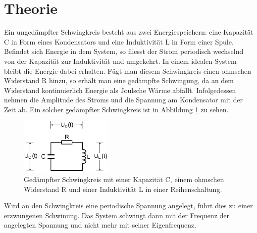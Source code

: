 \section{Theorie}
\label{sec:Theorie}
Ein ungedämpfter Schwingkreis besteht aus zwei Energiespeichern: eine Kapazität C
in Form eines Kondensators und eine Induktivität L in Form einer Spule. Befindet
sich Energie in dem System, so fliesst der Strom periodisch wechselnd von der
Kapazität zur Induktivität und umgekehrt. In einem idealen System bleibt die Energie
dabei erhalten.
Fügt man diesem Schwingkreis einen ohmschen Widerstand R hinzu, so erhält man eine
gedämpfte Schwingung, da an dem Widerstand kontinuierlich Energie als Joulsche Wärme
abfällt. Infolgedessen nehmen die Amplitude des Stroms und die Spannung am
Kondensator mit der Zeit ab. Ein solcher gedämpfter Schwingkreis ist in Abbildung
\ref{fig:gedaempfter_schwingkreis} zu sehen.
\begin{figure}
  \centering
  \includegraphics[width=0.4\textwidth]{gedaempfter_schwingkreis.png}
  \caption{Gedämpfter Schwingkreis mit einer Kapazität C, einem ohmschen Widerstand R
  und einer Induktivität L in einer Reihenschaltung.}
  \label{fig:gedaempfter_schwingkreis}
\end{figure}
Wird an den Schwingkreis eine periodische Spannung angelegt, führt dies zu einer
erzwungenen Schwinung. Das System schwingt dann mit der Frequenz der angelegten
Spannung und nicht mehr mit seiner Eigenfrequenz.
\cite{sample}
